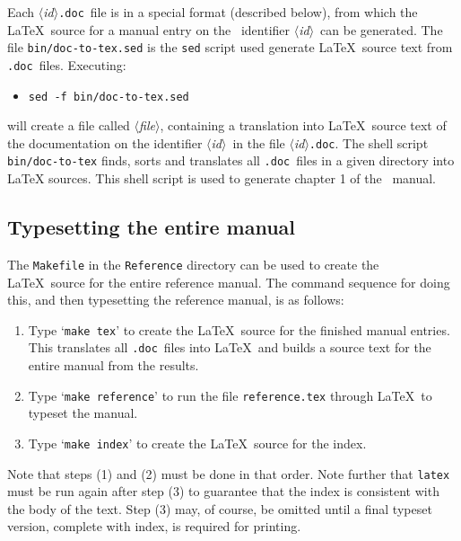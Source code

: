 \documentclass[12pt]{article}
\def\id{{$\langle${\it id\/}$\rangle$}}
\def\file{{$\langle${\it file}$\rangle$}}
\def\doc{{\tt .doc}}
\def\bnum#1{{\raise0.6pt\hbox{(}#1\raise0.6pt\hbox{)}}}
\def\latex{{\LaTeX}}
\def\sp{\hspace*{3.5mm}}
\begin{document}
Each \id\doc\ file is in a special format (described below), from which the
\latex\ source for a manual entry on the \ML\ identifier \id\ can be generated.
The file {\tt bin/doc-to-tex.sed} is the {\tt sed} script used generate \latex\
source text from \doc\ files. Executing:

\begin{itemize}
\item {\tt sed -f bin/doc-to-tex.sed}\sp  \id\doc\sp {\tt >}\sp \file
\end{itemize}

\noindent will create a file called \file, containing a translation into
\latex\ source text of the documentation on the identifier \id\ in the file
\id\doc.  The shell script {\tt bin/doc-to-tex} finds, sorts and translates all
\doc\ files in a given directory into LaTeX sources. This shell script is used
to generate chapter 1 of the \REFERENCE\ manual.

\subsection{Typesetting the entire manual}\label{ref-make}

The {\tt Makefile} in the {\tt Reference} directory can be used to create the
\latex\ source for the entire reference manual.  The command sequence for
doing this, and then typesetting the reference manual, is as follows:

\begin{enumerate}

\item Type `{\tt make tex}' to create the \latex\ source for the finished
manual entries.  This translates all \doc\ files into \latex\ and builds a
source text for the entire manual from the results.

\item Type `{\tt make reference}' to run the file {\tt reference.tex} through
\latex\ to typeset the manual.

\item Type `{\tt make index}' to create the \latex\ source for the index.

\end{enumerate}

\noindent Note that steps \bnum{1} and \bnum{2} must be done in that order.
Note further that {\tt latex} must be run again after step \bnum{3} to
guarantee that the index is consistent with the body of the text. Step \bnum{3}
may, of course, be omitted until a final typeset version, complete with index,
is required for printing.
\end{document}
